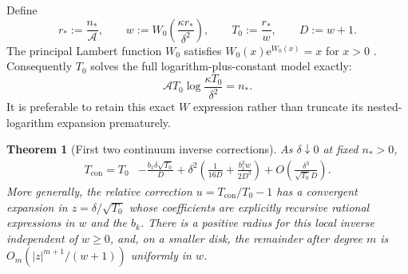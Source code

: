 \documentclass[11pt,a4paper]{article}
\numberwithin{equation}{section}
\newtheorem{theorem}{Theorem}[section]
\theoremstyle{definition}
\newcommand{\con}{\mathrm{con}}
\newcommand{\e}{\mathrm e}
\newcommand{\Aconst}{\mathcal A}
\begin{document}
Define
\begin{equation}
 r_*:=\frac{n_*}{\Aconst},\qquad
 w:=W_0\left(\frac{\kappa r_*}{\delta^2}\right),\qquad
 T_0:=\frac{r_*}{w},\qquad D:=w+1.
 \label{eq:T0}
\end{equation}
The principal Lambert function $W_0$ satisfies $W_0(x)\e^{W_0(x)}=x$
for $x>0$ \cite{Corless1996}. Consequently $T_0$ solves the full
logarithm-plus-constant model exactly:
\begin{equation}
 \Aconst T_0\log\frac{\kappa T_0}{\delta^2}=n_*.
 \label{eq:logmodel}
\end{equation}
It is preferable to retain this exact $W$ expression rather than
truncate its nested-logarithm expansion prematurely.

\begin{theorem}[First two continuum inverse corrections]
\label{thm:inverse}
As $\delta\downarrow0$ at fixed $n_*>0$,
\begin{align}
 T_{\con}=T_0
 &-\frac{b_1\delta\sqrt{T_0}}{D}
 +\delta^2\left(\frac1{16D}+\frac{b_1^2w}{2D^3}\right)
 +O\left(\frac{\delta^3}{\sqrt{T_0}D}\right).
 \label{eq:inverse2}
\end{align}
More generally, the relative correction $u=T_{\con}/T_0-1$ has a
convergent expansion in $z=\delta/\sqrt{T_0}$ whose coefficients are
explicitly recursive rational expressions in $w$ and the $b_k$.
There is a positive radius for this local inverse independent of
$w\ge0$, and, on a smaller disk, the remainder after degree $m$ is
$O_m(|z|^{m+1}/(w+1))$ uniformly in $w$.
\end{theorem}
\end{document}
